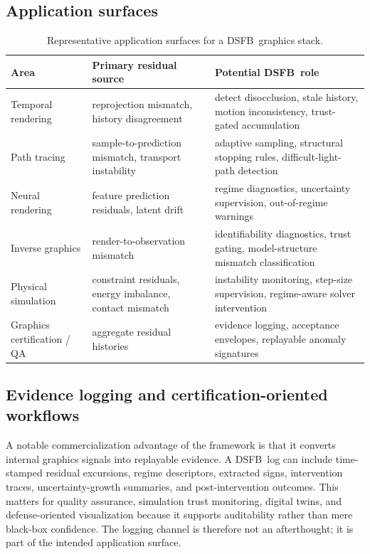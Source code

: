 \documentclass[11pt,letterpaper]{article}
\newcommand{\dsfb}{\textsc{DSFB}}
\theoremstyle{gcresult}
\theoremstyle{definition}
\begin{document}
\subsection{Application surfaces}
\begin{table}[H]
\centering
\caption{Representative application surfaces for a \dsfb\ graphics stack.}
\label{tab:applications}
\begin{tabularx}{\textwidth}{>{\raggedright\arraybackslash}p{} >{\raggedright\arraybackslash}p{} >{\raggedright\arraybackslash}X}
\toprule
\textbf{Area} & \textbf{Primary residual source} & \textbf{Potential \dsfb\ role} \\
\midrule
Temporal rendering & reprojection mismatch, history disagreement & detect disocclusion, stale history, motion inconsistency, trust-gated accumulation \\
Path tracing & sample-to-prediction mismatch, transport instability & adaptive sampling, structural stopping rules, difficult-light-path detection \\
Neural rendering & feature prediction residuals, latent drift & regime diagnostics, uncertainty supervision, out-of-regime warnings \\
Inverse graphics & render-to-observation mismatch & identifiability diagnostics, trust gating, model-structure mismatch classification \\
Physical simulation & constraint residuals, energy imbalance, contact mismatch & instability monitoring, step-size supervision, regime-aware solver intervention \\
Graphics certification / QA & aggregate residual histories & evidence logging, acceptance envelopes, replayable anomaly signatures \\
\bottomrule
\end{tabularx}
\end{table}

\subsection{Evidence logging and certification-oriented workflows}
A notable commercialization advantage of the framework is that it converts internal graphics signals into replayable evidence. A \dsfb\ log can include time-stamped residual excursions, regime descriptors, extracted signs, intervention traces, uncertainty-growth summaries, and post-intervention outcomes. This matters for quality assurance, simulation trust monitoring, digital twins, and defense-oriented visualization because it supports auditability rather than mere black-box confidence. The logging channel is therefore not an afterthought; it is part of the intended application surface.
\end{document}
